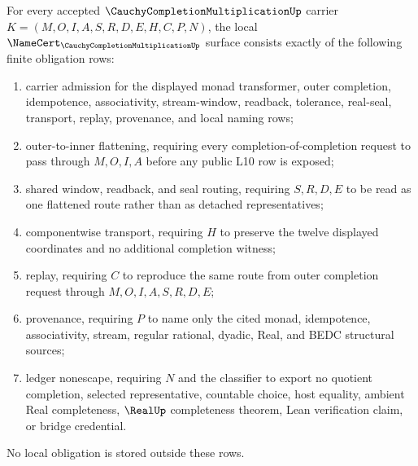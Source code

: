 \begin{theorem}
\label{thm:cauchy-completion-multiplication-namecert-obligations}
For every accepted $\CauchyCompletionMultiplicationUp$ carrier $K=(M,O,I,A,S,R,D,E,H,C,P,N)$, the local $\NameCert_{\CauchyCompletionMultiplicationUp}$ surface consists exactly of the following finite obligation rows:
\begin{enumerate}
\item carrier admission for the displayed monad transformer, outer completion, idempotence, associativity, stream-window, readback, tolerance, real-seal, transport, replay, provenance, and local naming rows;
\item outer-to-inner flattening, requiring every completion-of-completion request to pass through $M,O,I,A$ before any public L10 row is exposed;
\item shared window, readback, and seal routing, requiring $S,R,D,E$ to be read as one flattened route rather than as detached representatives;
\item componentwise transport, requiring $H$ to preserve the twelve displayed coordinates and no additional completion witness;
\item replay, requiring $C$ to reproduce the same route from outer completion request through $M,O,I,A,S,R,D,E$;
\item provenance, requiring $P$ to name only the cited monad, idempotence, associativity, stream, regular rational, dyadic, Real, and BEDC structural sources;
\item ledger nonescape, requiring $N$ and the classifier to export no quotient completion, selected representative, countable choice, host equality, ambient Real completeness, $\RealUp$ completeness theorem, Lean verification claim, or bridge credential.
\end{enumerate}
No local obligation is stored outside these rows.
\end{theorem}

